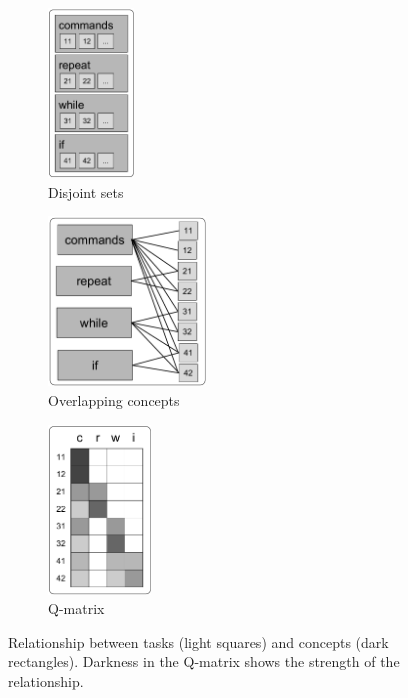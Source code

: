 \begin{figure}[htb]
\centering
\begin{subfigure}[t]{0.25\textwidth}
\centering
\includegraphics[height=45mm]{img/concepts-tasks-disjoint}
\caption{Disjoint sets}
\label{fig:concepts-tasks-disjoint}
\end{subfigure}%
\begin{subfigure}[t]{0.44\textwidth}
\centering
\includegraphics[height=45mm]{img/concepts-tasks-overlapping}
\caption{Overlapping concepts}
\label{fig:concepts-tasks-overlapping}
\end{subfigure}
\begin{subfigure}[t]{0.3\textwidth}
\centering
\includegraphics[height=45mm]{img/concepts-tasks-qmatrix}
\caption{Q-matrix}
\label{fig:concepts-tasks-qmatrix}
\end{subfigure}
\caption{%
  Relationship between tasks (light squares) and concepts (dark rectangles).
  Darkness in the Q-matrix shows the strength of the relationship.} %
\label{fig:concepts-tasks-relationships}
\end{figure}



